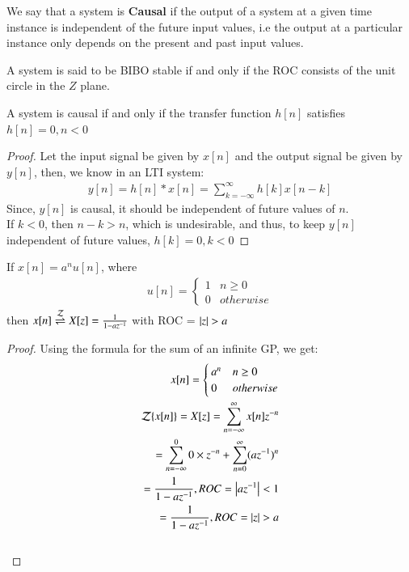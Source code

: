 \documentclass[journal,12pt,twocolumn]{IEEEtran}
\begin{document}
\begin{definition}
We say that a system is \textbf{Causal} if the output of a system at a given time instance is independent of the future input values, i.e the output at a particular instance only depends on the present and past input values.
\end{definition}

\begin{lemma}
A system is said to be BIBO stable if and only if the ROC consists of the unit circle in the $Z$ plane.
\end{lemma}
\begin{lemma}
A system is causal if and only if the transfer function $h[n]$ satisfies $h[n] = 0 , n<0$
\end{lemma}
\begin{proof}
Let the input signal be given by $x[n]$ and the output signal be given by $y[n]$, then, we know in an LTI system:
\begin{align}
    y[n] = h[n] * x[n] = \sum_{k = -\infty}^\infty h[k]x[n-k]
\end{align}
Since, $y[n]$ is causal, it should be independent of future values of $n$. \\
If $k < 0$, then $n - k > n$, which is undesirable, and thus, to keep $y[n]$ independent of future values, $h[k] = 0 , k< 0$
\end{proof}
\begin{lemma}
If $x[n] = a^nu[n]$, where 
\begin{align}
    u[n] = 
    \begin{cases}
    1 & n \geq 0\\
    0 & otherwise
    \end{cases}
\end{align}
then $x[n] \overset{\mathcal{Z}}{ \rightleftharpoons} X[z] = \frac{1}{1 - az^{-1}}$ with ROC = $\left\vert z\right\vert>a$
\label{z-transform}
\end{lemma}
\begin{proof}
Using the formula for the sum of an infinite GP, we get:
\begin{align}
    x[n] = 
    \begin{cases}
    a^n & n\geq 0\\
    0 & otherwise
    \end{cases}\\
    \mathcal{Z}\{x[n]\} = X[z] = \sum_{n = -\infty}^\infty x[n]z^{-n}\\
    = \sum_{n = -\infty}^0 0 \times z^{-n} + \sum_{n = 0}^{\infty} (az^{-1})^n\\
     = \frac{1}{1 - az^{-1}} , ROC = \left\vert az^{-1}\right\vert < 1\\
      = \frac{1}{1 - az^{-1}} , ROC =  \left\vert z\right\vert > a
\end{align}\\ 

\end{proof}
\end{document}
